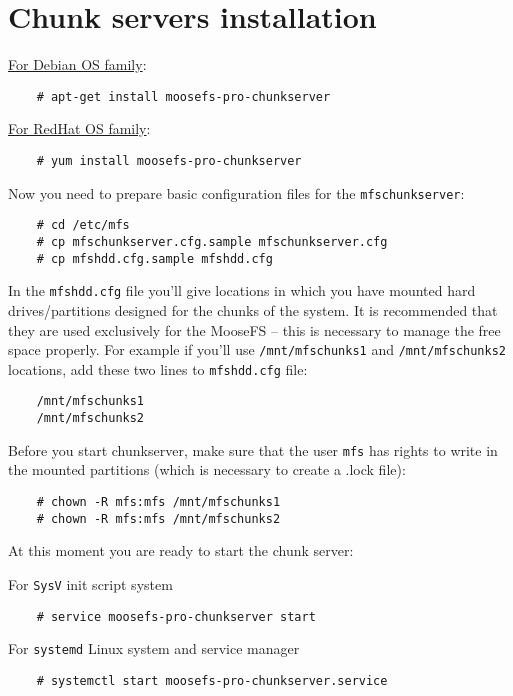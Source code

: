 \documentclass[a4paper,11pt,english]{report}
\def\code#1{\texttt{#1}}
\begin{document}
		
		\section{Chunk servers installation}

		\underline{For Debian OS family}:
		\begin{lstlisting}
	# apt-get install moosefs-pro-chunkserver
		\end{lstlisting}
		

		\underline{For RedHat OS family}:
		\begin{lstlisting}
	# yum install moosefs-pro-chunkserver
		\end{lstlisting}

		
		Now you need to prepare basic configuration files for the \code{mfschunkserver}:
		\begin{lstlisting}
	# cd /etc/mfs
	# cp mfschunkserver.cfg.sample mfschunkserver.cfg
	# cp mfshdd.cfg.sample mfshdd.cfg
		\end{lstlisting}
		
		
		In the \code{mfshdd.cfg} file you'll give locations in which you have mounted hard drives/partitions designed for the chunks of the system. It is recommended that they are used exclusively for the MooseFS -- this is necessary to manage the free space properly. For example if you'll use \code{/mnt/mfschunks1} and \code{/mnt/mfschunks2} locations, add these two lines to \code{mfshdd.cfg} file:

		\begin{lstlisting}
	/mnt/mfschunks1
	/mnt/mfschunks2
		\end{lstlisting}


		Before you start chunkserver, make sure that the user \code{mfs} has rights to write in the mounted partitions (which is necessary to create a .lock file):

		\begin{lstlisting}
	# chown -R mfs:mfs /mnt/mfschunks1
	# chown -R mfs:mfs /mnt/mfschunks2
		\end{lstlisting}

		
		At this moment you are ready to start the chunk server:
			
		For \code{SysV} init script system
		\begin{lstlisting}
	# service moosefs-pro-chunkserver start
		\end{lstlisting}
		
		For \code{systemd} Linux system and service manager 
		\begin{lstlisting}
	# systemctl start moosefs-pro-chunkserver.service
		\end{lstlisting}
		
\end{document}
